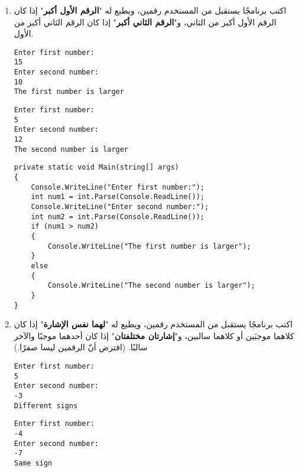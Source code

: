 \documentclass[12pt, twoside]{article}
\begin{document}
\begin{enumerate}[itemsep=3em]
\begin{enumerate}
\item
اكتب برنامجًا يستقبل من المستخدم رقمين، ويطبع له "\textbf{الرقم الأول أكبر}" إذا كان الرقم الأول أكبر من الثاني، و"\textbf{الرقم الثاني أكبر}" إذا كان الرقم الثاني أكبر من الأول.
\ifdetailed
\begin{example}[1]
\begin{english}
\begin{verbatim}
Enter first number:
15
Enter second number:
10
The first number is larger
\end{verbatim}
\end{english}
\end{example}
\begin{example}[2]
\begin{english}
\begin{verbatim}
Enter first number:
5
Enter second number:
12
The second number is larger
\end{verbatim}
\end{english}
\end{example}

\ifwithsols
\begin{solution}
\begin{english}
\begin{verbatim}
private static void Main(string[] args)
{
    Console.WriteLine("Enter first number:");
    int num1 = int.Parse(Console.ReadLine());
    Console.WriteLine("Enter second number:");
    int num2 = int.Parse(Console.ReadLine());
    if (num1 > num2)
    {
        Console.WriteLine("The first number is larger");
    }
    else
    {
        Console.WriteLine("The second number is larger");
    }
}
\end{verbatim}
\end{english}
\end{solution}
\clearpage
\fi
\fi

\item
اكتب برنامجًا يستقبل من المستخدم رقمين، ويطبع له "\textbf{لهما نفس الإشارة}" إذا كان كلاهما موجبَين أو كلاهما سالبين، و"\textbf{إشارتان مختلفتان}" إذا كان أحدهما موجبًا والآخر سالبًا.
(افترض أنّ الرقمين ليسا صفرًا.)
\ifdetailed
\begin{example}[1]
\begin{english}
\begin{verbatim}
Enter first number:
5
Enter second number:
-3
Different signs
\end{verbatim}
\end{english}
\end{example}
\begin{example}[2]
\begin{english}
\begin{verbatim}
Enter first number:
-4
Enter second number:
-7
Same sign
\end{verbatim}
\end{english}
\end{example}


\end{enumerate}
\end{enumerate}
\end{document}
